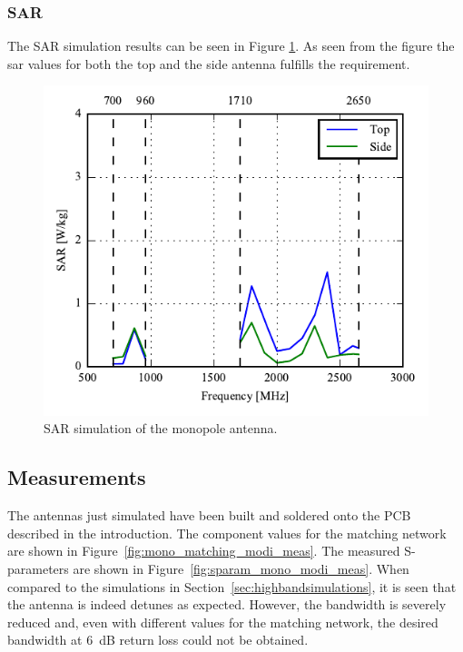 \FloatBarrier
\subsubsection{SAR}
The SAR simulation results can be seen in Figure \ref{fig:sar_mono_modi}. As seen from the figure the sar values for both the top and the side antenna fulfills the requirement.
\begin{figure}[htbp]
    \centering
    \includegraphics{img/tech_sol/monopole/highband/ue/sar/sar.pdf}
    \caption{SAR simulation of the monopole antenna.}
    \label{fig:sar_mono_modi}
\end{figure}

\FloatBarrier
\subsection{Measurements}
The antennas just simulated have been built and soldered onto the PCB described in the introduction. The component values for the matching network are shown in Figure~\ref{fig:mono_matching_modi_meas}. The measured S-parameters are shown in Figure~\ref{fig:sparam_mono_modi_meas}. When compared to the simulations in Section~\ref{sec:highbandsimulations}, it is seen that the antenna is indeed detunes as expected. However, the bandwidth is severely reduced and, even with different values for the matching network, the desired bandwidth at \SI{6}{dB} return loss could not be obtained.

